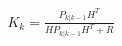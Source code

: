 \documentclass[preview]{standalone}
\begin{document}
\begin{align*}
K_k = \frac{P_{k|k-1} H^T}{H P_{k|k-1} H^T + R}
\end{align*}
\end{document}
